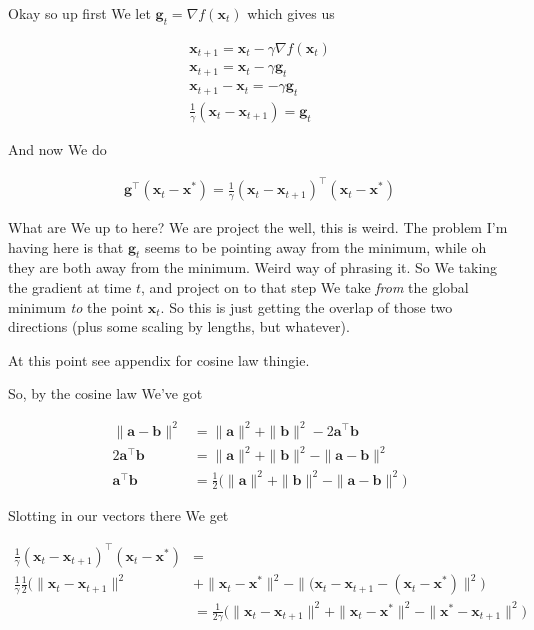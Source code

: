 \documentclass{article}
\begin{document}
	Okay so up first We let $\mathbf{g}_t = \nabla f(\mathbf{x}_t)$ which gives us
	
	\begin{align*}
		\mathbf{x}_{t+1} = \mathbf{x}_t - \gamma\nabla f(\mathbf{x}_t)\\
		\mathbf{x}_{t+1} = \mathbf{x}_t - \gamma\mathbf{g}_t\\
		\mathbf{x}_{t+1} - \mathbf{x}_t =  - \gamma\mathbf{g}_t\\
		\frac{1}{\gamma}(\mathbf{x}_t - \mathbf{x}_{t+1}) =  \mathbf{g}_t
	\end{align*}
	
	And now We do
	
	\begin{align*}
		\mathbf{g}^\top (\mathbf{x}_t - \mathbf{x}^*) = \frac{1}{\gamma}(\mathbf{x}_t - \mathbf{x}_{t+1})^\top (\mathbf{x}_t - \mathbf{x}^*)
	\end{align*}
	
	What are We up to here? We are project the well, this is weird. The problem I'm having here is that $\mathbf{g}_t$ seems to be pointing away from the minimum, while oh they are both away from the minimum. Weird way of phrasing it. So We taking the gradient at time $t$, and project on to that step We take \textit{from} the global minimum \textit{to} the point $\mathbf{x}_t$. So this is just getting the overlap of those two directions (plus some scaling by lengths, but whatever). 
	
	At this point see appendix for cosine law thingie.
	
	So, by the cosine law We've  got
	
	\begin{align*}
		\|\mathbf{a - b}\|^2 &= \|\mathbf{a}\|^2 + \|\mathbf{b}\|^2 - 2\mathbf{a}^\top\mathbf{b}\\
		2\mathbf{a}^\top\mathbf{b} &= \|\mathbf{a}\|^2 + \|\mathbf{b}\|^2 - \|\mathbf{a - b}\|^2 \\
		\mathbf{a}^\top\mathbf{b} &=\frac{1}{2}\big( \|\mathbf{a}\|^2 + \|\mathbf{b}\|^2 - \|\mathbf{a - b}\|^2 \big)
	\end{align*}
	
	Slotting in our vectors there We get
	
	\begin{align*}
		\frac{1}{\gamma}(\mathbf{x}_t - \mathbf{x}_{t+1})^\top (\mathbf{x}_t - \mathbf{x}^*) &=\\
		\frac{1}{\gamma}\frac{1}{2}\big( \|\mathbf{x}_t - \mathbf{x}_{t+1}\|^2 &+ \|\mathbf{x}_t - \mathbf{x}^*\|^2 - \| (\mathbf{x}_t - \mathbf{x}_{t+1} -(\mathbf{x}_t - \mathbf{x}^*) \|^2 \big) \\
		&= \frac{1}{2\gamma}\big( \|\mathbf{x}_t - \mathbf{x}_{t+1}\|^2 + \|\mathbf{x}_t - \mathbf{x}^*\|^2 - \| \mathbf{x}^* - \mathbf{x}_{t+1} \|^2 \big) \\
	\end{align*}
	
\end{document}
